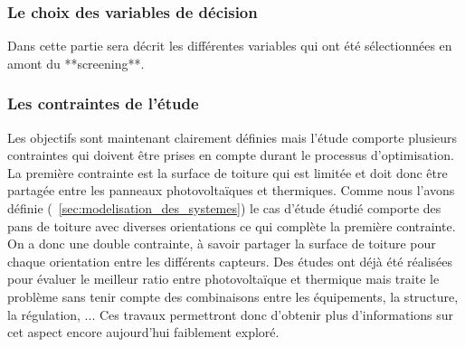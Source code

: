 \subsubsection{Le choix des variables de décision} %
\label{ssub:le_choix_des_variables_de_decision}

Dans cette partie sera décrit les différentes variables qui ont été sélectionnées
en amont du **screening**.

\subsubsection{Les contraintes de l’étude} %
\label{ssub:les_contraintes_de_l_etude}
Les objectifs sont maintenant clairement définies mais l’étude comporte plusieurs
contraintes qui doivent être prises en compte durant le processus d’optimisation.
La première contrainte est la surface de toiture qui est limitée et doit donc être
partagée entre les panneaux photovoltaïques et thermiques. Comme nous l’avons définie
(~\autoref{sec:modelisation_des_systemes}) le cas d’étude étudié comporte des pans
de toiture avec diverses orientations ce qui complète la première contrainte.
On a donc une double contrainte, à savoir
partager la surface de toiture pour chaque orientation entre les différents capteurs.
Des études ont déjà été réalisées pour évaluer le meilleur ratio entre photovoltaïque
et thermique mais traite le problème sans tenir compte des combinaisons
entre les équipements, la structure, la régulation, ... Ces travaux permettront donc
d’obtenir plus d’informations sur cet aspect encore aujourd’hui faiblement exploré.

